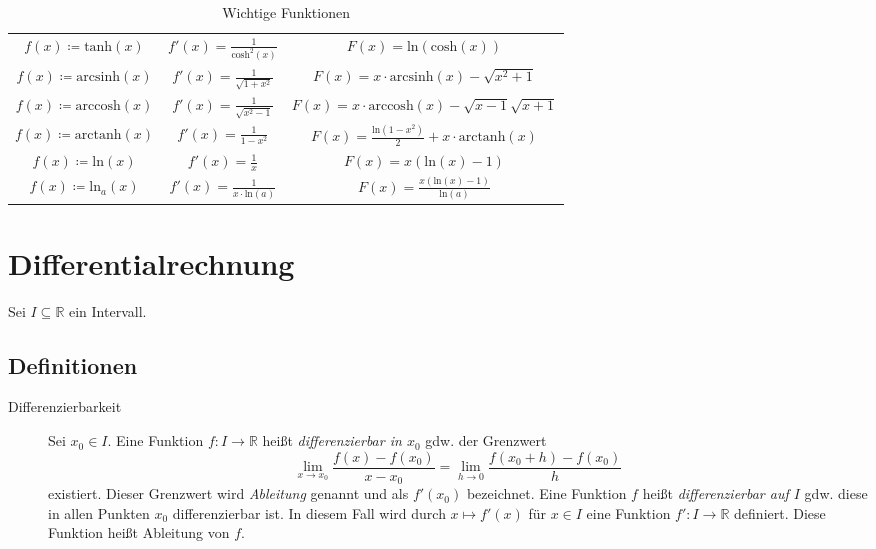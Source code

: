 \documentclass[a4paper, 11pt, accentcolor = tud3b]{tudreport}
\begin{document}
\begin{table}[ht]
\begin{tabular}{| c | c | c |}
                    $ f(x) \coloneqq \text{tanh}(x) $ & $ f'(x) = \frac{1}{\text{cosh} ^ 2 (x)} $ & $ F(x) = \text{ln}(\text{cosh}(x)) $ \\
                    $ f(x) \coloneqq \text{arcsinh}(x) $ & $ f'(x) = \frac{1}{\sqrt{1 + x ^ 2}} $ & $ F(x) = x \cdot \text{arcsinh}(x) - \sqrt{x ^ 2 + 1} $ \\
                    $ f(x) \coloneqq \text{arccosh}(x) $ & $ f'(x) = \frac{1}{\sqrt{x ^ 2 - 1}} $ & $ F(x) = x \cdot \text{arccosh}(x) - \sqrt{x - 1} \sqrt{x + 1} $ \\
                    $ f(x) \coloneqq \text{arctanh}(x) $ & $ f'(x) = \frac{1}{1 - x ^ 2} $ & $ F(x) = \frac{\text{ln}(1 - x ^ 2)}{2} + x \cdot \text{arctanh}(x) $ \\
                    $ f(x) \coloneqq \text{ln}(x) $ & $ f'(x) = \frac{1}{x} $ & $ F(x) = x (\text{ln}(x) - 1) $ \\
                    $ f(x) \coloneqq \text{ln} _ a (x) $ & $ f'(x) = \frac{1}{x \cdot \text{ln}(a)} $ & $ F(x) = \frac{x (\text{ln}(x) - 1)}{\text{ln}(a)} $ \\
                    \hline
                \end{tabular}
                \caption{Wichtige Funktionen}
            \end{table}

    \chapter{Differentialrechnung}
        Sei $ I \subseteq \mathbb{R} $ ein Intervall.

        \section{Definitionen}
            \begin{description}
                \item[Differenzierbarkeit] Sei $ x _ 0 \in I $. Eine Funktion $ f : I \rightarrow \mathbb{R} $ heißt \textit{differenzierbar in $ x _ 0 $} gdw. der Grenzwert \[ \lim _ { x \rightarrow x _ 0 } \frac{f(x) - f(x _ 0)}{x - x _ 0} = \lim _ { h \rightarrow 0 } \frac{f(x _ 0 + h) - f(x _ 0)}{h} \] existiert. Dieser Grenzwert wird \textit{Ableitung} genannt und als $ f'(x _ 0) $ bezeichnet. Eine Funktion $ f $ heißt \textit{differenzierbar auf $ I $} gdw. diese in allen Punkten $ x _ 0 $ differenzierbar ist. In diesem Fall wird durch $ x \mapsto f'(x) $ für $ x \in I $ eine Funktion $ f' : I \rightarrow \mathbb{R} $ definiert. Diese Funktion heißt Ableitung von $ f $.
            \end{description}
\end{document}

